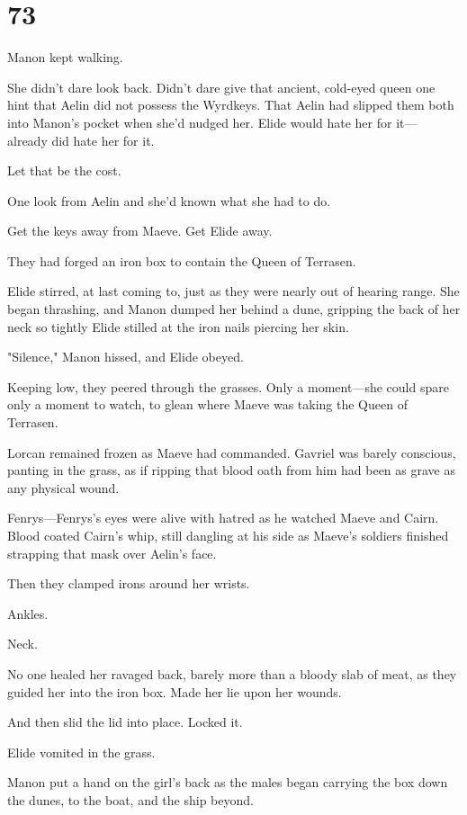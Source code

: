 
\chapter{73}

Manon kept walking.

She didn't dare look back.
Didn't dare give that ancient, cold-eyed queen one hint that Aelin did not possess the Wyrdkeys.
That Aelin had slipped them both into Manon's pocket when she'd nudged her.
Elide would hate her for it--- already did hate her for it.

Let that be the cost.

One look from Aelin and she'd known what she had to do.

Get the keys away from Maeve.
Get Elide away.

They had forged an iron box to contain the Queen of Terrasen.

Elide stirred, at last coming to, just as they were nearly out of hearing range.
She began thrashing, and Manon dumped her behind a dune, gripping the back of her neck so tightly Elide stilled at the iron nails piercing her skin.

"Silence," Manon hissed, and Elide obeyed.

Keeping low, they peered through the grasses.
Only a moment---she could spare only a moment to watch, to glean where Maeve was taking the Queen of Terrasen.

Lorcan remained frozen as Maeve had commanded.
Gavriel was barely conscious, panting in the grass, as if ripping that blood oath from him had been as grave as any physical wound.

Fenrys---Fenrys's eyes were alive with hatred as he watched Maeve and Cairn.
Blood coated Cairn's whip, still dangling at his side as Maeve's soldiers finished strapping that mask over Aelin's face.

Then they clamped irons around her wrists.

Ankles.

Neck.

No one healed her ravaged back, barely more than a bloody slab of meat, as they guided her into the iron box.
Made her lie upon her wounds.

And then slid the lid into place.
Locked it.

Elide vomited in the grass.

Manon put a hand on the girl's back as the males began carrying the box down the dunes, to the boat, and the ship beyond.

